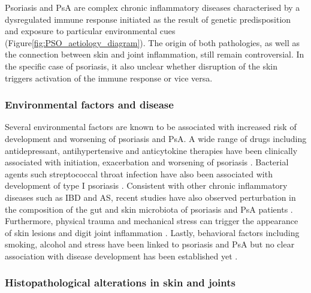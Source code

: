 Psoriasis and PsA are complex chronic inflammatory diseases characterised by a dysregulated immune response initiated as the result of genetic predisposition and exposure to particular environmental cues (Figure\ref{fig:PSO_aetiology_diagram}). The origin of both pathologies, as well as the connection between skin and joint inflammation, still remain controversial. In the specific case of psoriasis, it also unclear whether disruption of the skin triggers activation of the immune response or vice versa.


\subsubsection*{Environmental factors and disease}
Several environmental factors are known to be associated with increased risk of development and worsening of psoriasis and PsA. A wide range of drugs including antidepressant, antihypertensive and anticytokine therapies have been clinically associated with initiation, exacerbation and worsening of psoriasis \parencite{Kim2010}. Bacterial agents such streptococcal throat infection have also been associated with development of type I psoriasis \parencite{Gudjonsson2003,Valdimarsson2009, Diluvio2006}. Consistent with other chronic inflammatory diseases such as IBD and AS, recent studies have also observed perturbation in the composition of the gut and skin microbiota of psoriasis and PsA patients \parencite{add reference}. Furthermore, physical trauma and mechanical stress can trigger the appearance of skin lesions and digit joint inflammation \parencite {Weiss2002,Nestle2009}. Lastly, behavioral factors including smoking, alcohol and stress have been linked to psoriasis and PsA but no clear association with disease development has been established yet \parencite{Meglio2014}.


\subsubsection*{Histopathological alterations in skin and joints}

